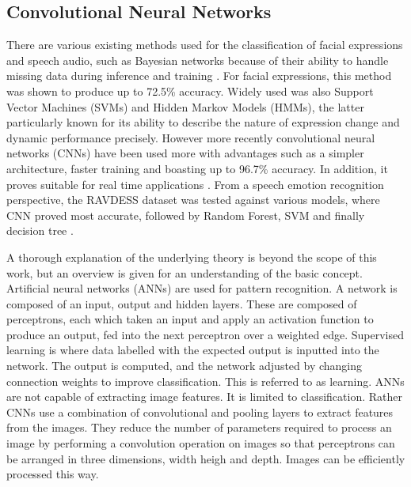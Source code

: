 \documentclass[12pt,a4paper]{article}
\begin{document}
\subsection{Convolutional Neural Networks}
There are various existing methods used for the classification of facial expressions and speech audio, such as Bayesian networks because of their ability to handle missing data during inference and training \cite{cohen2003learning}. For facial expressions, this method was shown to produce up to 72.5\% accuracy. Widely used was also Support Vector Machines (SVMs) and Hidden Markov Models (HMMs), the latter particularly known for its ability to describe the nature of expression change and dynamic performance precisely. However more recently convolutional neural networks (CNNs) have been used more with advantages such as a simpler architecture, faster training and boasting up to 96.7\% accuracy. In addition, it proves suitable for real time applications \cite{LOPES2017610}. From a speech emotion recognition perspective, the RAVDESS \cite{livingstone2018ryerson} dataset was tested against various models, where CNN proved most accurate, followed by Random Forest, SVM and finally decision tree \cite{christy2020multimodal}. 

A thorough explanation of the underlying theory is beyond the scope of this work, but an overview is given for an understanding of the basic concept. Artificial neural networks (ANNs) are used for pattern recognition. A network is composed of an input, output and hidden layers. These are composed of perceptrons, each which taken an input and apply an activation function to produce an output, fed into the next perceptron over a weighted edge. Supervised learning is where data labelled with the expected output is inputted into the network. The output is computed, and the network adjusted by changing connection weights to improve classification. This is referred to as learning. ANNs are not capable of extracting image features. It is limited to classification. Rather CNNs use a combination of convolutional and pooling layers to extract features from the images. They reduce the number of parameters required to process an image by performing a convolution operation on images so that perceptrons can be arranged in three dimensions, width heigh and depth. Images can be efficiently processed this way.
\end{document}

